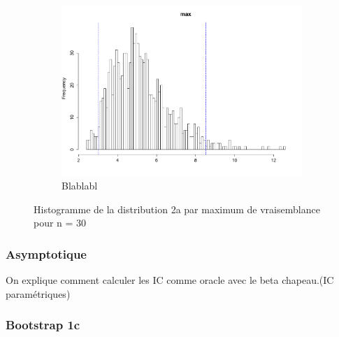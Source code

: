 \documentclass{article}
\renewcommand*{\(}{\left(}
\renewcommand*{\)}{\right)}
\begin{document}
\begin{figure}[H]
\begin{subfigure}[b]{0.3\textwidth}
        \includegraphics[width = \linewidth]{img/BootstrapAEMV-Max-30.pdf}
        \caption{Blablabl}
        \label{fig:BAEMVMax}
    \end{subfigure}%
    \caption{Histogramme de la distribution 2a par maximum de vraisemblance pour n = 30}
    \label{fig:BAEMV}
\end{figure}

\subsubsection{Asymptotique}
On explique comment calculer les IC comme oracle avec le beta chapeau.(IC paramétriques)

\subsubsection{Bootstrap 1c}
\end{document}
